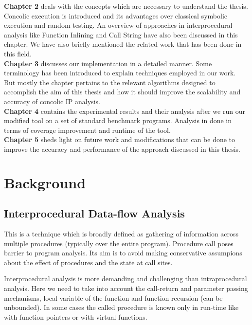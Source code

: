 \documentclass[12pt,oneside]{book}
\begin{document}
\textbf{Chapter 2} deals with the concepts which are necessary to understand the thesis. Concolic execution is introduced and its advantages over classical symbolic execution and random testing. An overview of approaches in interprocedural analysis like Function Inlining and Call String have also been discussed in this chapter. We have also briefly mentioned the related work that has been done in this field. \\

\textbf{Chapter 3} discusses our implementation in a detailed manner. Some terminology has been introduced to explain techniques employed in our work. But mostly the chapter pertains to the relevant algorithms designed to accomplish the aim of this thesis and how it should improve the scalability and accuracy of concolic IP analysis.\\

\textbf{Chapter 4} contains the experimental results and their analysis after we run our modified tool on a set of standard benchmark programs. Analysis in done in terms of coverage improvement and runtime of the tool.\\

\textbf{Chapter 5} sheds light on future work and modifications that can be done to improve the accuracy and performance of the approach discussed in this thesis.


\newpage
\chapter{Background}


\section {Interprocedural Data-flow Analysis}
This is a technique which is broadly defined as gathering of information across multiple procedures (typically over the entire program). Procedure call poses barrier to program analysis. Its aim is to avoid making conservative assumpions about the effect of procedures and the state at call sites.

Interprocedural analysis is more demanding and challenging than intraprocedural analysis. Here we need to take into account the call-return and parameter passing mechanisms, local variable of the function and function recursion (can be unbounded). In some cases the called procedure is known only in run-time like with function pointers or with virtual functions. 
\end{document}
